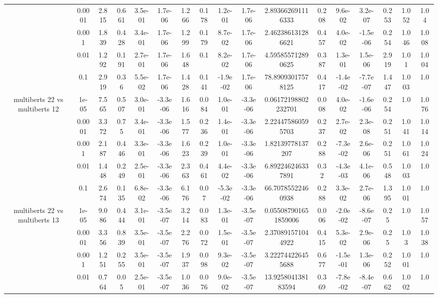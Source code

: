 \begin{tabular}{|c|c|c|c|c|c|c|c|c|c|c|c|c|c|c|c|c|}
 & 0.0001 & 2.815 & 0.661 & 3.5e-01 & 1.7e-06 & 1.266 & 0.178 & 1.2e-01 & 1.7e-06 & 2.893662691116333 & 0.208 & 9.6e-02 & 3.2e-07 & 0.253 & 1.052 & 1.04 \\
 & 0.001 & 1.839 & 0.428 & 3.4e-01 & 1.7e-06 & 1.299 & 0.179 & 8.7e-02 & 1.7e-06 & 2.462386131286621 & 0.457 & 4.0e-02 & -1.5e-06 & 0.254 & 1.046 & 1.008 \\
 & 0.01 & 1.292 & 0.191 & 2.7e-01 & 1.7e-06 & 1.648 & 0.1 & 8.2e-02 & 1.7e-06 & 4.595855712890625 & 0.387 & 1.3e-01 & 1.5e-06 & 2.919 & 1.01 & 1.004 \\
 & 0.1 & 2.919 & 0.36 & 5.5e-02 & 1.7e-06 & 1.428 & 0.141 & -1.9e-02 & 1.7e-06 & 78.89093017578125 & 0.417 & -1.4e-02 & -7.7e-07 & 1.447 & 1.003 & 1.0 \\
\hline
\multirow{5}{*}{multiberts 22 vs multiberts 12} & 1e-05 & 7.565 & 0.507 & 3.0e-01 & -3.3e-06 & 1.616 & 0.084 & 1.0e-01 & -3.3e-06 & 0.06172198802232701 & 0.008 & 4.0e-02 & -1.6e-06 & 0.254 & 1.0 & 1.076 \\
 & 0.0001 & 3.372 & 0.75 & 3.4e-01 & -3.3e-06 & 1.577 & 0.236 & 1.4e-01 & -3.3e-06 & 2.224475860595703 & 0.237 & 2.7e-02 & 2.3e-08 & 0.251 & 1.041 & 1.014 \\
 & 0.001 & 2.187 & 0.446 & 3.3e-01 & -3.3e-06 & 1.623 & 0.239 & 1.0e-01 & -3.3e-06 & 1.82139778137207 & 0.288 & -7.3e-02 & 2.6e-06 & 0.251 & 1.061 & 1.024 \\
 & 0.01 & 1.448 & 0.249 & 2.5e-01 & -3.3e-06 & 2.363 & 0.461 & 4.4e-02 & -3.3e-06 & 6.892246246337891 & 0.32 & -4.3e-03 & 4.1e-06 & 0.548 & 1.003 & 1.0 \\
 & 0.1 & 2.674 & 0.135 & 6.8e-02 & -3.3e-06 & 6.176 & 0.07 & -5.3e-02 & -3.3e-06 & 66.70785522460938 & 0.288 & 3.3e-02 & 2.7e-06 & 1.395 & 1.001 & 1.0 \\
\hline
\multirow{5}{*}{multiberts 22 vs multiberts 13} & 1e-05 & 9.086 & 0.444 & 3.1e-01 & -3.5e-07 & 3.214 & 0.083 & 1.3e-01 & -3.5e-07 & 0.055087901651859006 & 0.006 & -2.0e-02 & -8.6e-07 & 0.25 & 1.0 & 1.057 \\
 & 0.0001 & 3.356 & 0.839 & 3.5e-01 & -3.5e-07 & 2.276 & 0.072 & 1.5e-01 & -3.5e-07 & 2.370891571044922 & 0.415 & 5.3e-02 & 2.9e-06 & 0.25 & 1.03 & 1.038 \\
 & 0.001 & 1.251 & 0.255 & 3.5e-01 & -3.5e-07 & 1.937 & 0.098 & 9.3e-02 & -3.5e-07 & 3.222744226455688 & 0.677 & -1.5e-01 & 1.3e-06 & 0.252 & 1.001 & 1.0 \\
 & 0.01 & 0.764 & 0.05 & 2.5e-01 & -3.5e-07 & 1.036 & 0.076 & 9.0e-02 & -3.5e-07 & 13.925804138183594 & 0.369 & -7.8e-02 & -8.4e-07 & 0.662 & 1.002 & 1.0 \\

\end{tabular}
